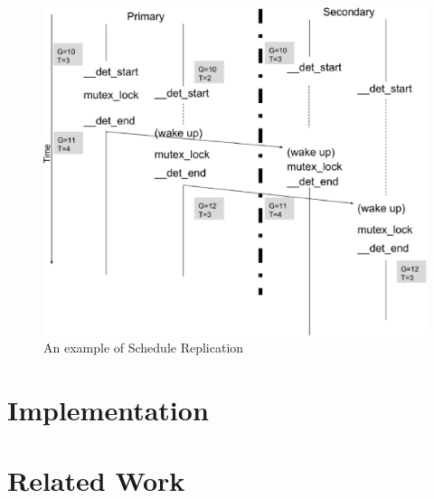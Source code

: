 \begin{figure}
\centering
\includegraphics[width=0.9\columnwidth]{figures/sched_rep}
\caption{An example of Schedule Replication}
\label{f:scherep}
\end{figure}


\section{Implementation}
\section{Related Work}
